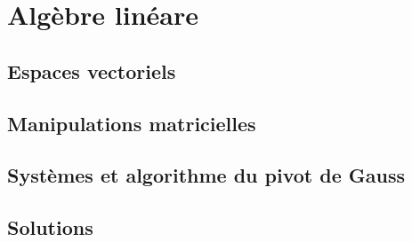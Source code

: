 
\chapter{Algèbre linéare}
\label{chap:algebre}

\section{Espaces vectoriels}

\section{Manipulations matricielles}

\section{Systèmes et algorithme du pivot de Gauss}


%

\section*{Solutions}

\shipoutAnswer




